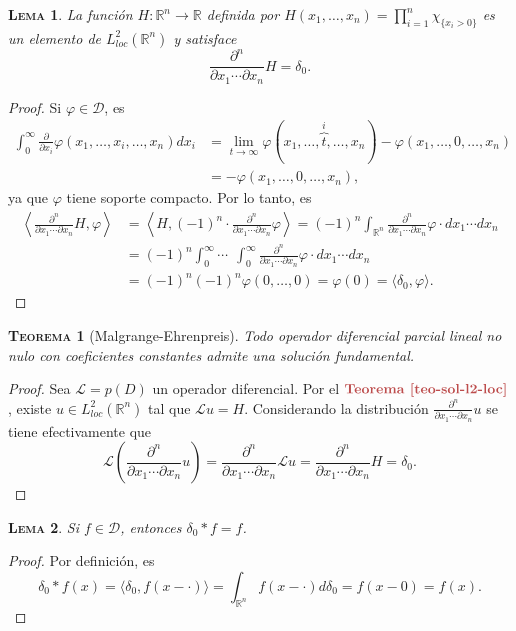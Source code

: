 \documentclass[11pt]{article}
\theoremstyle{colored}
\newtheorem{theorem}{\scshape Teorema}
\newtheorem{lemma}{\scshape Lema}
\newcommand{\R}{\mathbb{R}}
\newcommand{\test}{\mathscr{D}}
\newcommand{\ev}[1]{\langle #1 \rangle}
\renewcommand{\L}{\mathscr{L}}
\newcommand{\paint}[1]{\color{color}{#1}}
\newcommand{\tpaint}[1]{\paint{\textbf{#1}}}
\begin{document}
\begin{lemma} La función $H : \R^n \to \R$ definida por $H(x_1,\dots, x_n) = \prod_{i=1}^n \chi_{\{x_i > 0\}}$ es un elemento de $L_{loc}^2(\R^n)$ y satisface
\[
\frac{\partial^n}{\partial x_1 \cdots \partial x_n} H = \delta_0.
\]
\end{lemma}
\begin{proof} Si $\varphi \in \test$, es
\begin{align*}
\int_0^\infty \frac{\partial}{\partial x_i}\varphi(x_1,\dots, x_i,\dots,x_n)dx_i &= \lim_{t \to \infty} \varphi(x_1,\dots,\overbrace{t}^i,\dots,x_n) - \varphi(x_1, \dots,0,\dots,x_n)\\
& = - \varphi(x_1, \dots,0,\dots,x_n),
\end{align*}
ya que $\varphi$ tiene soporte compacto. Por lo tanto, es
\begin{align*}
\left\ev{\frac{\partial^n}{\partial x_1 \cdots \partial x_n} H,\varphi\right} &= \left\ev{H,(-1)^n \cdot \frac{\partial^n}{\partial x_1 \cdots \partial x_n}\varphi\right} = (-1)^n\int_{\R^n}\frac{\partial^n}{\partial x_1 \cdots \partial x_n}\varphi \cdot dx_1 \cdots dx_n\\
&= (-1)^n\int_0^\infty \cdots \ \ \int_0^\infty\frac{\partial^n}{\partial x_1 \cdots \partial x_n}\varphi \cdot dx_1 \cdots dx_n\\ &= (-1)^n(-1)^n\varphi(0,\dots,0) = \varphi(0) = \ev{\delta_0,\varphi}.
\end{align*}
\end{proof}

\begin{theorem}[Malgrange-Ehrenpreis] Todo operador diferencial parcial lineal no nulo con coeficientes constantes admite una solución fundamental.
\end{theorem}
\begin{proof} Sea $\L = p(D)$ un operador diferencial. Por el $\tpaint{Teorema \ref{teo-sol-l2-loc}}$, existe $u \in L^2_{loc}(\R^n)$ tal que $\L u = H$. Considerando la distribución $\frac{\partial^n}{\partial x_1 \cdots \partial x_n} u$ se tiene efectivamente que
\[
\L \left(\frac{\partial^n}{\partial x_1 \cdots \partial x_n} u\right) = \frac{\partial^n}{\partial x_1 \cdots \partial x_n} \L u = \frac{\partial^n}{\partial x_1 \cdots \partial x_n} H = \delta_0.
\]
\end{proof}

\begin{lemma} Si $f \in \test$, entonces $\delta_0 \ast f = f$.
\end{lemma}
\begin{proof} Por definición, es
\[
\delta_0 \ast f(x) = \ev{\delta_0,f(x -\cdot)} = \int_{\R^n} f(x-\cdot) d \delta_0 = f(x - 0) = f(x).
\]
\end{proof}
\end{document}
